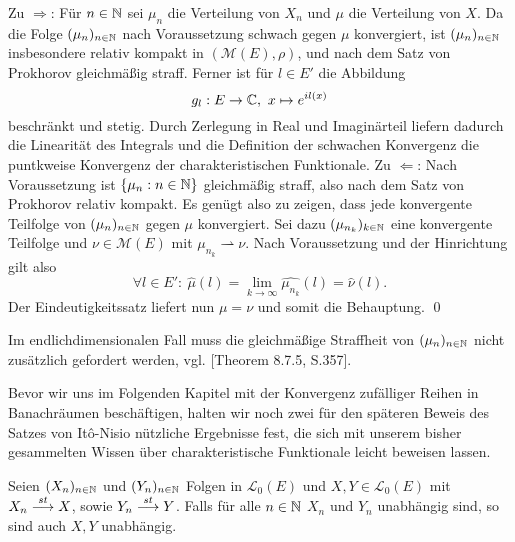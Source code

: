 \begin{proof*}
    Zu $\Rightarrow$: Für $n \in \mathbb{N}$ sei $\mu_n$ die Verteilung von $X_n$ und $\mu$ die Verteilung von $X$. Da die Folge $(\mu_n)_{n \in \mathbb{N}}$ nach Voraussetzung schwach gegen $\mu$ konvergiert, 
    ist $(\mu_n)_{n \in  \mathbb{N}}$ insbesondere relativ kompakt in $(\mathcal{M}(E), \rho)$, und nach dem Satz von Prokhorov gleichmäßig straff. 
    Ferner ist für $l \in E'$ die Abbildung 
    $$
        g_l: E \to \mathbb{C},  \ x \mapsto e^{il(x)}
    $$ 
    beschränkt und stetig. Durch Zerlegung in Real und Imaginärteil liefern dadurch die Linearität des Integrals und die Definition der schwachen Konvergenz die puntkweise Konvergenz der charakteristischen Funktionale. 
    \newline 
    Zu $\Leftarrow$: Nach Voraussetzung ist  $\{\mu_n : n \in \mathbb{N}\}$ gleichmäßig straff, also nach dem Satz von Prokhorov relativ kompakt. Es genügt also zu zeigen, dass jede konvergente Teilfolge von $(\mu_n)_{n \in \mathbb{N}}$ gegen $\mu$ konvergiert. 
    Sei dazu $(\mu_{n_k})_{k \in \mathbb{N}}$ eine konvergente Teilfolge und $\nu \in \mathcal{M}(E)$ mit $\mu_{n_k} \rightharpoonup \nu$. Nach Voraussetzung und der Hinrichtung gilt also 
    $$
        \forall l \in E': \ \widehat{\mu}(l) = \lim_{k \to \infty} \widehat{\mu_{n_k}}(l) = \widehat{\nu}(l).
    $$
    Der Eindeutigkeitssatz liefert nun $\mu = \nu$ und somit die Behauptung. \qed
\end{proof*}

\begin{remark}
    Im endlichdimensionalen Fall muss die gleichmäßige Straffheit von $(\mu_n)_{n \in \mathbb{N}}$ nicht zusätzlich gefordert werden, vgl. \cite{gs}[Theorem 8.7.5, S.357]. 
\end{remark}

Bevor wir uns im Folgenden Kapitel mit der Konvergenz zufälliger Reihen in Banachräumen beschäftigen, halten wir noch zwei für den späteren Beweis des Satzes von Itô-Nisio nützliche Ergebnisse fest, die sich mit unserem bisher gesammelten Wissen über charakteristische Funktionale leicht beweisen lassen.  

\begin{proposition}
    Seien $(X_n)_{n \in \mathbb{N}}$ und $(Y_n)_{n \in \mathbb{N}}$ Folgen in $\mathcal{L}_0(E)$ und $X,Y \in \mathcal{L}_0(E)$ mit $X_n \overset{st}{\longrightarrow} X$, sowie $Y_n \overset{st}{\longrightarrow} Y$. 
    Falls für alle $n \in \mathbb{N}$ $X_n$ und $Y_n$ unabhängig sind, so sind auch $X,Y$ unabhängig. 
\end{proposition}

